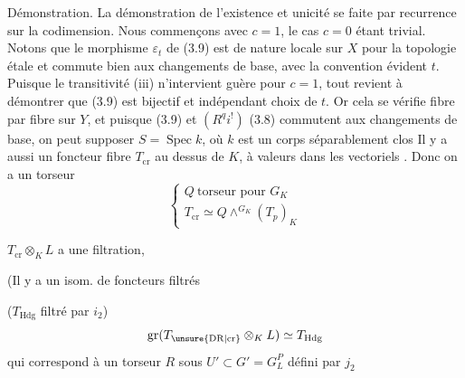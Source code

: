 Démonstration. La démonstration de l'existence et unicité se faite par recurrence sur la codimension. Nous commençons avec $c=1$, le cas $c=0$ étant trivial. Notons que le morphisme $\varepsilon_t$ de (3.9) est de nature locale sur $X$ pour la topologie étale et commute bien aux changements de base, avec la convention évident  $t$. Puisque le transitivité (iii) n'intervient guère pour $c=1$, tout revient à démontrer que (3.9) est bijectif et indépendant  choix de $t$. Or cela se vérifie fibre par fibre sur $Y$, et puisque (3.9) et $(R^qi^!)$ (3.8) commutent aux changements de base, on peut supposer $S=\operatorname{Spec}k$, où $k$ est un corps séparablement clos
Il y a aussi un foncteur fibre $T_{\mathrm{cr}}$ au  dessus de $K$, à valeurs dans les vectoriels . Donc on a un torseur
\[
\left\{\begin{gathered}
\boxed{Q\ \text{torseur pour }G_K}\\
T_{\mathrm{cr}}\simeq Q\mathbin{\wedge}^{G_K}(T_p)_K
\end{gathered}\right.
\]

$T_{\mathrm{cr}}\otimes_K L$ a une filtration,

(Il y a un isom. de  foncteurs filtrés

($T_{\mathrm{Hdg}}$ filtré par $i_2$)
\[
\operatorname{gr}(T_{\unsure{\mathrm{DR}|\mathrm{cr}}}\otimes_K L)\simeq T_{\mathrm{Hdg}}
\]
qui correspond à  un torseur $R$ sous $U'\subset G'=G_L^P$
défini par $j_2$


